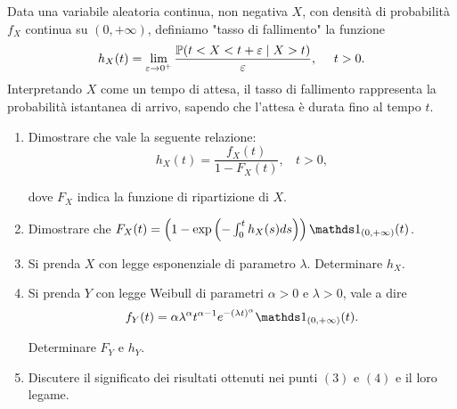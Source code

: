 Data una variabile aleatoria continua, non negativa $X$, con densità di probabilità $f_{X}$ continua su $\left(0,+\infty \right)$, definiamo "tasso di fallimento" la funzione
\begin{equation*}
h_{X}(t) =\lim_{\varepsilon \rightarrow 0^{+}}\frac{\mathbb{P}(t< X< t+\varepsilon \mid X >t)}{\varepsilon } ,\ \ \ \ t >0.
\end{equation*}
Interpretando $X$ come un tempo di attesa, il tasso di fallimento rappresenta la probabilità istantanea di arrivo, sapendo che l'attesa è durata fino al tempo $t$.
\begin{enumerate}
\item Dimostrare che vale la seguente relazione:\begin{equation*}
h_{X}(t) =\frac{f_{X}(t)}{1-F_{X}(t)} ,\ \ \ \ t >0,
\end{equation*}

dove $F_{X}$ indica la funzione di ripartizione di $X$.
\item Dimostrare che $F_{X}(t) =\left(1-\exp\left(-\int_{0}^{t} h_{X}(s) ds\right)\right) \Ind_{(0,+\infty)}(t)$.
\item Si prenda $X$ con legge esponenziale di parametro $\lambda $. Determinare $h_{X}$.
\item Si prenda $Y$ con legge Weibull di parametri $\alpha  >0$ e $\lambda  >0$, vale a dire
\begin{equation*}
f_{Y}(t) =\alpha \lambda^{\alpha } t^{\alpha -1} e^{-(\lambda t)^{\alpha }} \Ind_{(0,+\infty)}(t) .
\end{equation*}

Determinare $F_{Y}$ e $h_{Y}$.
\item Discutere il significato dei risultati ottenuti nei punti $(3)$ e $(4)$ e il loro legame.
\end{enumerate}
\Esercizio{}

